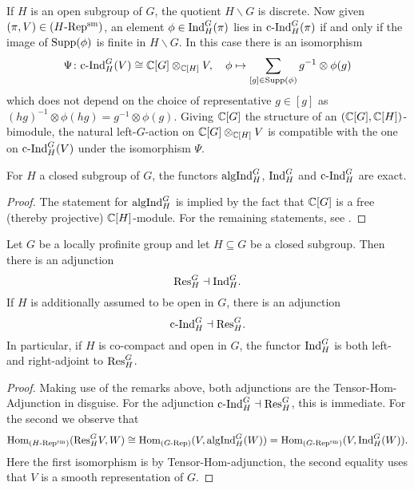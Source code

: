 \documentclass[../main.tex]{subfiles}
\begin{document}
\begin{rmk} 
  If $H$ is an open subgroup of $G$, the quotient $H \backslash G$ is 
  discrete. Now given $(\pi, V) \in {({H}\text-\allowbreak\mathrm{Rep^{\mathrm{sm}}})}$, an element $\phi \in \mathrm{Ind}_H^G(\pi)$
  lies in $\mathrm{c\text{-}Ind}_H^G(\pi)$ if and only if 
  the image of $\operatorname{Supp}(\phi)$ is finite in $H \backslash G$. 
  In this case there is an isomorphism
  \begin{equation}\label{eq:cIndTensorExpr}
    \Psi\colon \mathrm{c\text{-}Ind}_H^G(V) \cong \mathbb{C}[G] \otimes_{\mathbb{C}[H]} V, \quad \phi \mapsto \sum_{[g]
    \in \operatorname{Supp}(\phi)} g^{-1} \otimes \phi(g)
  \end{equation}
  which does not depend on the choice of representative $g \in [g]$ as 
  $(hg)^{-1} \otimes \phi(hg) = g^{-1} \otimes \phi(g)$. 
  Giving $\mathbb{C}[G]$ the structure of an $(\mathbb{C}[G], \mathbb{C}[H])$-bimodule, the natural
  left-$G$-action on $\mathbb{C}[G] \otimes_{\mathbb{C}[H]} V$ is compatible with the one 
  on $\mathrm{c\text{-}Ind}_H^G(V)$ under the isomorphism $\Psi$. 
\end{rmk}

\begin{prop}\label{prop:InducedRepresentationExact}
  For $H$ a closed subgroup of $G$, the functors $\mathrm{algInd}_H^G$, $\mathrm{Ind}_H^G$ and
  $\mathrm{c\text{-}Ind}_H^G$  are exact. 
  \begin{proof}
    The statement for $\mathrm{algInd}_H^G$ is implied by the fact that 
    $\mathbb{C}[G]$ is a free (thereby projective) $\mathbb{C}[H]$-module. For the remaining statements,
    see \cite[p. 18f]{bushnell2006local}.
  \end{proof}
\end{prop}



\begin{thm}\label{thm:SmFrobRec}
  Let $G$ be a locally profinite group and let $H \subseteq G$ be a closed subgroup.
  Then there is an adjunction
  \begin{equation*}
    \mathrm{Res}_H^G \dashv \mathrm{Ind}_H^G.
  \end{equation*}
  If $H$ is additionally assumed to be open in $G$, there is an adjunction
  $$\mathrm{c\text{-}Ind}_H^G \dashv \mathrm{Res}_H^G.$$
  In particular, if $H$ is co-compact and open in $G$, the functor $\mathrm{Ind}_H^G$
  is both left- and right-adjoint to $\mathrm{Res}_H^G$.
\begin{proof}
  Making use of the remarks above, both adjunctions are the
  Tensor-Hom-Adjunction in disguise. For the adjunction $\mathrm{c\text{-}Ind}_H^G \dashv
  \mathrm{Res}_H^G$, this is immediate. For the second we observe that
  \begin{equation*}
    \operatorname{Hom}_{{({H}\text-\allowbreak\mathrm{Rep^{\mathrm{sm}}})}}(\mathrm{Res}_H^G V, W) \cong \operatorname{Hom}_{{({G}\text-\allowbreak\mathrm{Rep})}}(V, \mathrm{algInd}_H^G(W)) = 
    \operatorname{Hom}_{{({G}\text-\allowbreak\mathrm{Rep^{\mathrm{sm}}})}}(V, \mathrm{Ind}_H^G(W)).
  \end{equation*}
  Here the first isomorphism is by Tensor-Hom-adjunction, the second 
  equality uses that $V$ is a smooth representation of $G$.
\end{proof}
\end{thm}
\end{document}
